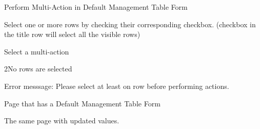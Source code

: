 
\begin{uc}{Perform Multi-Action in Default Management Table Form}

    \begin{uc-mss}
    	\item Select one or more rows by checking their corresponding checkbox. (checkbox
    	in the title row will select all the visible rows)
    	\item Select a multi-action
    \end{uc-mss}
    
    \begin{uc-ext}

        \begin{uc-fail}{2}{No rows are selected}
        \item Error messsage: Please select at least on row before performing actions.
        \end{uc-fail}
        
    \end{uc-ext}

    \begin{uc-pre}
    \item Page that has a Default Management Table Form
    \end{uc-pre}

    \begin{uc-post}
    \item The same page with updated values.
    \end{uc-post}

\end{uc}

